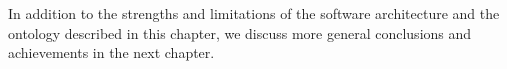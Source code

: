 In addition to the strengths and limitations of the software architecture and the ontology described in this chapter, we discuss more general conclusions and achievements in the next chapter.



% 
% 
% 
